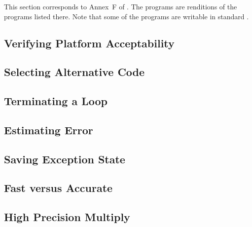 \documentclass[../../CDR-IEEE-754-support.tex]{subfiles}
\begin{document}
This section corresponds to Annex~F of \cite{2012:LIA1}.  The programs
are \CL{} renditions of the programs listed there.  Note that some of
the programs are writable in standard \CL{}.


\subsection{Verifying Platform Acceptability}


\subsection{Selecting Alternative Code}


\subsection{Terminating a Loop}


\subsection{Estimating Error}


\subsection{Saving Exception State}


\subsection{Fast versus Accurate}


\subsection{High Precision Multiply}

\end{document}
